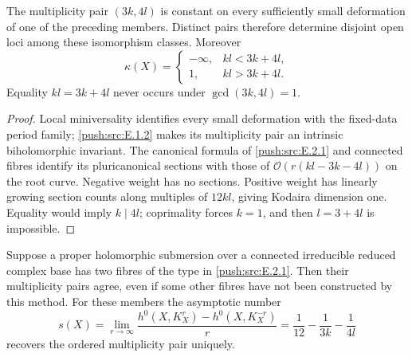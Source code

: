 \begin{proposition}\label{push:src:E.2.2}
The multiplicity pair $(3k,4l)$ is constant on every sufficiently
small deformation of one of the preceding members.  Distinct
pairs therefore determine disjoint open loci among these
isomorphism classes.  Moreover
\[
 \kappa(X)=\begin{cases}-\infty,&kl<3k+4l,\\1,&kl>3k+4l.
 \end{cases}
\]
Equality $kl=3k+4l$ never occurs under $\gcd(3k,4l)=1$.
\end{proposition}

\begin{proof}
Local miniversality identifies every small deformation with the
fixed-data period family; \ref{push:src:E.1.2} makes its multiplicity pair an
intrinsic biholomorphic invariant.  The canonical formula of
\ref{push:src:E.2.1} and connected fibres identify its pluricanonical sections
with those of $\mathcal O(r(kl-3k-4l))$ on the root curve.
Negative weight has no sections.  Positive weight has linearly
growing section counts along multiples of $12kl$, giving
Kodaira dimension one.  Equality would imply $k\mid4l$;
coprimality forces $k=1$, and then $l=3+4l$ is impossible.
\end{proof}

\begin{proposition}\label{push:src:E.2.3}
Suppose a proper holomorphic submersion over a connected
irreducible reduced complex base has two fibres of the type
in \ref{push:src:E.2.1}.  Then their multiplicity pairs agree, even if some
other fibres have not been constructed by this method.
For these members the asymptotic number
\[
 s(X)=\lim_{r\to\infty}
 \frac{h^0(X,K_X^r)-h^0(X,K_X^{-r})}{r}
 =\frac1{12}-\frac1{3k}-\frac1{4l}
\]
recovers the ordered multiplicity pair uniquely.
\end{proposition}

